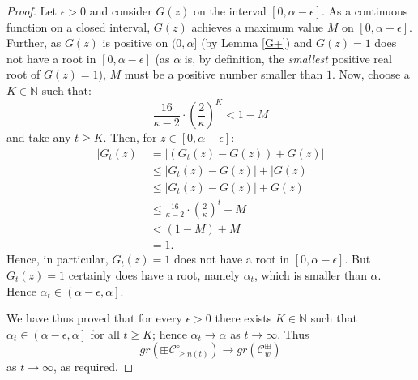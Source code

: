 \documentclass[10pt,a4paper]{amsart}
\theoremstyle{plain}
\theoremstyle{definition}
\theoremstyle{remark}
\begin{document}
\begin{proof}
Let $\epsilon > 0$ and consider $G(z)$ on the interval $\left[0, \alpha - \epsilon\right]$. As a continuous function on a closed interval, $G(z)$ achieves a maximum value $M$ on $\left[0, \alpha - \epsilon\right]$. Further, as $G(z)$ is positive on $(0,\alpha]$ (by Lemma \ref{G+}) and $G(z)=1$ does not have a root in $\left[0, \alpha - \epsilon\right]$ (as $\alpha$ is, by definition, the \emph{smallest} positive real root of $G(z)=1$), $M$ must be a positive number smaller than $1$. Now, choose a $K \in \mathbb{N}$ such that:
\[
\frac{16}{\kappa - 2} \cdot \left(\frac{2}{\kappa}\right)^{K} < 1 - M
\]
and take any $t \geq K$. Then, for $z \in \left[0, \alpha - \epsilon\right]$:
\[
\begin{split}
\left|G_{t}(z)\right| & = \left|(G_{t}(z) - G(z)) + G(z)\right| \\
 & \leq \left|G_{t}(z) - G(z)\right| + \left|G(z)\right| \\
 & \leq \left|G_{t}(z) - G(z)\right| + G(z) \\
 & \leq \frac{16}{\kappa - 2} \cdot \left(\frac{2}{\kappa}\right)^{t} + M \\
 & < (1 - M) + M \\
 & = 1.
\end{split}
\]
Hence, in particular, $G_{t}(z)=1$ does not have a root in $\left[0, \alpha - \epsilon\right]$. But $G_{t}(z)=1$ certainly does have a root, namely $\alpha_{t}$, which is smaller than $\alpha$. Hence $\alpha_{t} \in \left(\alpha - \epsilon, \alpha\right]$.

We have thus proved that for every $\epsilon > 0$ there exists $K \in \mathbb{N}$ such that $\alpha_{t} \in \left(\alpha - \epsilon, \alpha\right]$ for all $t \geq K$; hence $\alpha_{t} \rightarrow \alpha$ as $t \rightarrow \infty$. Thus
\[
gr(\boxplus\mathcal{C}^{\circ}_{\geq n(t)}) \rightarrow gr(\mathcal{C}^{\boxplus}_{w})
\]
as $t\rightarrow\infty$, as required. \qedhere \end{proof}
\end{document}
